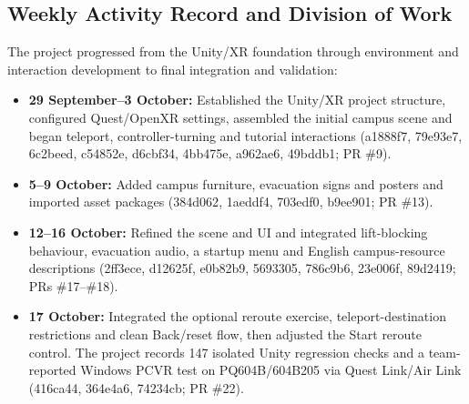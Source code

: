 \documentclass[12pt,a4paper]{article}
\newcommand{\code}[1]{\textnormal{#1}}
\begin{document}
\subsection{Weekly Activity Record and Division of Work}
The project progressed from the Unity/XR foundation through environment and
interaction development to final integration and validation:
\begin{itemize}
\item \textbf{29 September--3 October:} Established the Unity/XR project
structure, configured Quest/OpenXR settings, assembled the initial campus
scene and began teleport, controller-turning and tutorial interactions
(\code{a1888f7}, \code{79e93e7}, \code{6c2beed}, \code{c54852e},
\code{d6cbf34}, \code{4bb475e}, \code{a962ae6}, \code{49bddb1}; PR \#9).
\item \textbf{5--9 October:} Added campus furniture, evacuation signs and
posters and imported asset packages
(\code{384d062}, \code{1aeddf4}, \code{703edf0}, \code{b9ee901}; PR \#13).
\item \textbf{12--16 October:} Refined the scene and UI and integrated
lift-blocking behaviour, evacuation audio, a startup menu and English
campus-resource descriptions (\code{2ff3ece}, \code{d12625f},
\code{e0b82b9}, \code{5693305}, \code{786c9b6}, \code{23e006f},
\code{89d2419}; PRs \#17--\#18).
\item \textbf{17 October:} Integrated the optional reroute exercise,
teleport-destination restrictions and clean Back/reset flow, then adjusted
the Start reroute control. The project records 147 isolated Unity regression
checks and a team-reported Windows PCVR test on PQ604B/604B205 via Quest
Link/Air Link (\code{416ca44}, \code{364e4a6}, \code{74234cb}; PR \#22).
\end{itemize}
\end{document}
